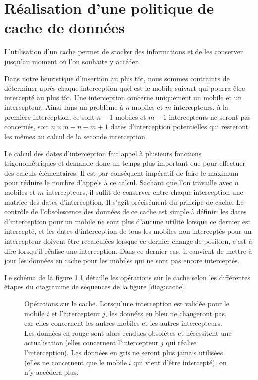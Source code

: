 \chapter{Réalisation d'une politique de cache de données}
\label{app:cache}
	L'utilisation d'un \gls{cache} permet de stocker des informations et de les conserver jusqu'au moment où l'on souhaite y accéder.

	Dans notre heuristique d'insertion au plus tôt, nous sommes contraints de déterminer après chaque interception quel est le mobile suivant qui pourra être intercepté au plus tôt. Une interception concerne uniquement un mobile et un intercepteur. Ainsi dans un problème à $n$ mobiles et $m$ intercepteurs, à la première interception, ce sont $n-1$ mobiles et $m-1$ intercepteurs ne seront pas concernés, soit $n \times m -n -m +1$ dates d'interception potentielles qui resteront les mêmes au calcul de la seconde interception.

	Le calcul des dates d'interception fait appel à plusieurs fonctions trigonométriques et demande donc un temps plus important que pour effectuer des calculs élémentaires. Il est par conséquent impératif de faire le maximum pour réduire le nombre d'appels à ce calcul. Sachant que l'on travaille avec $n$ mobiles et $m$ intercepteurs, il suffit de conserver entre chaque interception une matrice des dates d'interception. Il s'agit précisément du principe de cache. Le contrôle de l'obsolescence des données de ce cache est simple à définir: les dates d'interception pour un mobile ne sont plus d'aucune utilité lorsque ce dernier est intercepté, et les dates d'interception de tous les mobiles non-interceptés pour un intercepteur doivent être recalculées lorsque ce dernier change de position, c'est-à-dire lorsqu'il réalise une interception. Dans ce dernier cas, il convient de mettre à jour les données en cache pour les mobiles qui ne sont pas encore interceptés.

	Le schéma de la figure \ref{fig:cache} détaille les opérations sur le cache selon les différentes étapes du diagramme de séquences de la figure \ref{diag:cache}.
	\begin{figure}[h]
		\centering
		\begin{tikzpicture}
			
		\end{tikzpicture}
		\caption[Opérations sur le cache]{Opérations sur le cache. {\scriptsize Lorsqu'une interception est validée pour le mobile $i$ et l'intercepteur $j$, les données en bleu ne changeront pas, car elles concernent les autres mobiles et les autres intercepteurs. Les données en rouge sont alors rendues obsolètes et nécessitent une actualisation (elles concernent l'intercepteur $j$ qui réalise l'interception). Les données en gris ne seront plus jamais utilisées (elles ne concernent que le mobile $i$ qui vient d'être intercepté), on n'y accèdera plus.}}
		\label{fig:cache}
	\end{figure}

